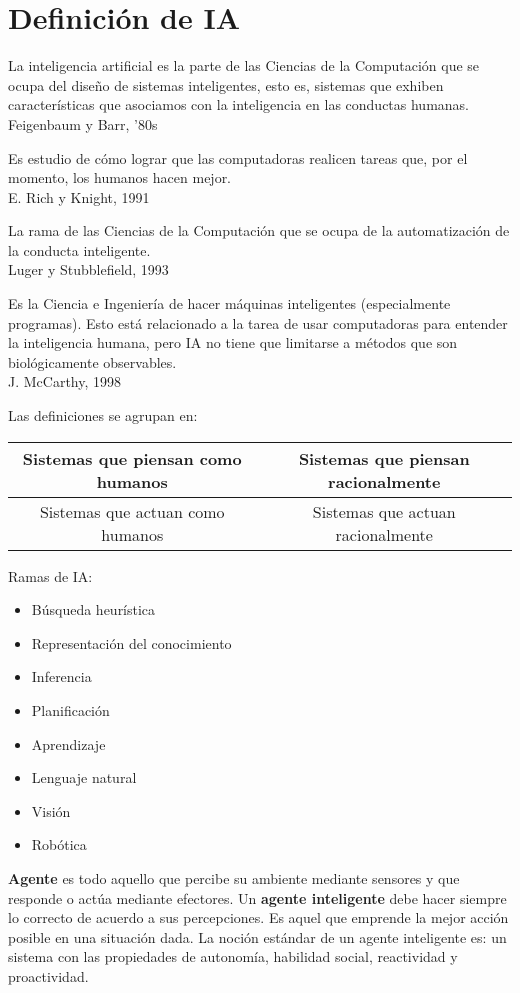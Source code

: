 

\section{Definición de IA}

La inteligencia artificial es la parte de las Ciencias de la Computación que
se ocupa del diseño de sistemas inteligentes, esto es, sistemas que exhiben
características que asociamos con la inteligencia en las conductas humanas.\\
Feigenbaum y Barr, '80s

Es estudio de cómo lograr que las computadoras realicen tareas que, por el
momento, los humanos hacen mejor.\\
E. Rich y Knight, 1991

La rama de las Ciencias de la Computación que se ocupa de la automatización
de la conducta inteligente.\\
Luger y Stubblefield, 1993

Es la Ciencia e Ingeniería de hacer máquinas inteligentes (especialmente
programas). Esto está relacionado a la tarea de usar computadoras para
entender la inteligencia humana, pero IA no tiene que limitarse a métodos
que son biológicamente observables.\\
J. McCarthy, 1998

Las definiciones se agrupan en:
\begin{tabular}{| c | c |}
\hline
Sistemas que piensan como humanos &
Sistemas que piensan racionalmente \\
\hline
Sistemas que actuan como humanos &
Sistemas que actuan racionalmente
\hline
\end{tabular}

Ramas de IA:
\begin{itemize}
    \item Búsqueda heurística
    \item Representación del conocimiento
    \item Inferencia
    \item Planificación
    \item Aprendizaje
    \item Lenguaje natural
    \item Visión
    \item Robótica
\end{itemize}

\textbf{Agente} es todo aquello que percibe su ambiente mediante sensores
y que responde o actúa mediante efectores. Un \textbf{agente inteligente}
debe hacer siempre lo correcto de acuerdo a sus percepciones. Es aquel que
emprende la mejor acción posible en una situación dada. La noción estándar
de un agente inteligente es: un sistema con las propiedades de autonomía,
habilidad social, reactividad y proactividad.

